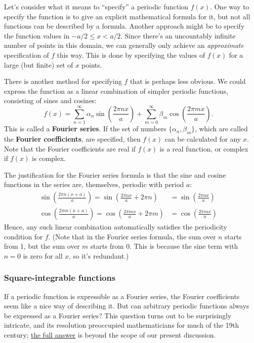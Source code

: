 \documentclass[10pt,a4paper]{article}
\begin{document}
Let's consider what it means to ``specify'' a periodic function
$f(x)$. One way to specify the function is to give an explicit
mathematical formula for it, but not all functions can be described by a
formula. Another approach might be to specify the function values in
$-a/2 \le x < a/2$. Since there's an uncountably infinite number of
points in this domain, we can generally only achieve an
\emph{approximate} specification of $f$ this way. This is done by
specifying the values of $f(x)$ for a large (but finite) set of $x$
points.

There is another method for specifying $f$ that is perhaps less
obvious. We could express the function as a linear combination of
simpler periodic functions, consisting of sines and cosines:
\begin{equation}
f(x) = \sum_{n=1}^\infty \alpha_n \sin\left(\frac{2\pi n x}{a}\right) + \sum_{m=0}^\infty \beta_m \cos\left(\frac{2 \pi m x}{a}\right).
\end{equation}
This is called a \textbf{Fourier series}. If the set of numbers
$\{\alpha_n, \beta_m\}$, which are called the \textbf{Fourier
coefficients}, are specified, then $f(x)$ can be calculated for any
$x$. Note that the Fourier coefficients are real if $f(x)$ is a real
function, or complex if $f(x)$ is complex.

The justification for the Fourier series formula is that the sine and
cosine functions in the series are, themselves, periodic with period
$a$:
\begin{align}
  \sin\left(\frac{2\pi n (x+a)}{a}\right) = \sin\left(\frac{2\pi n x}{a} + 2\pi n\right) &= \sin\left(\frac{2\pi n x}{a}\right)\\ \cos\left(\frac{2\pi m (x+a)}{a}\right) = \cos\left(\frac{2\pi m x}{a} + 2\pi m\right) &= \cos\left(\frac{2\pi m x}{a}\right)
\end{align}
Hence, any such linear combination automatically satisfies the
periodicity condition for $f$. (Note that in the Fourier series
formula, the sum over $n$ starts from 1, but the sum over $m$ starts
from 0. This is because the sine term with $n = 0$ is zero for all
$x$, so it's redundant.)

\subsubsection{Square-integrable functions}
\label{square-integrable-functions}

If a periodic function is expressible as a Fourier series, the Fourier
coefficients seem like a nice way of describing it. But can arbitrary
periodic functions always be expressed as a Fourier series? This
question turns out to be surprisingly intricate, and its resolution
preoccupied mathematicians for much of the 19th century;
\href{http://en.wikipedia.org/wiki/Convergence_of_Fourier_series}{the
full answer} is beyond the scope of our present discussion.
\end{document}
